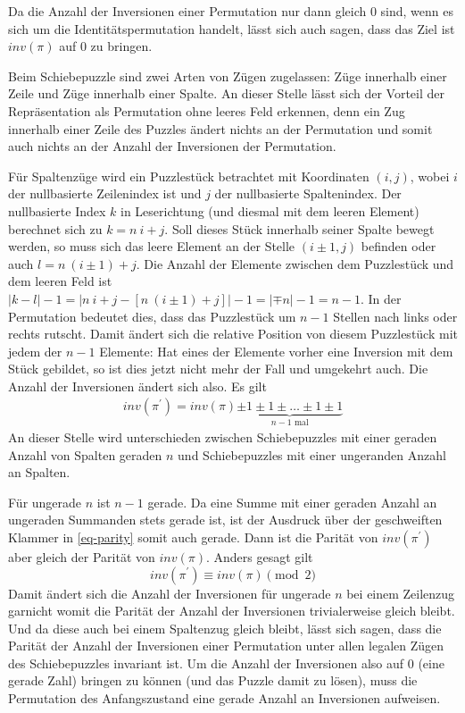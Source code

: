 \documentclass{whswinvcbook}
\begin{document}
Da die Anzahl der Inversionen einer Permutation nur dann gleich $0$ sind, wenn es sich um die Identitätspermutation handelt, lässt sich auch sagen, dass das Ziel ist $inv(\pi)$ auf $0$ zu bringen.

Beim Schiebepuzzle sind zwei Arten von Zügen zugelassen: Züge innerhalb einer Zeile und Züge innerhalb einer Spalte. An dieser Stelle lässt sich der Vorteil der Repräsentation als Permutation ohne leeres Feld erkennen, denn ein Zug innerhalb einer Zeile des Puzzles ändert nichts an der Permutation und somit auch nichts an der Anzahl der Inversionen der Permutation.

Für Spaltenzüge wird ein Puzzlestück betrachtet mit Koordinaten $(i,j)$, wobei $i$ der nullbasierte Zeilenindex ist und $j$ der nullbasierte Spaltenindex. Der nullbasierte Index $k$ in Leserichtung (und diesmal mit dem leeren Element) berechnet sich zu $k=n\:i+j$. Soll dieses Stück innerhalb seiner Spalte bewegt werden, so muss sich das leere Element an der Stelle $(i\pm1,j)$ befinden oder auch $l=n\:(i\pm1)+j$. Die Anzahl der Elemente zwischen dem Puzzlestück und dem leeren Feld ist $|k-l|-1=|n\:i+j-[n\:(i\pm1)+j]|-1=|\mp n|-1=n-1$. In der Permutation bedeutet dies, dass das Puzzlestück um $n-1$ Stellen nach links oder rechts rutscht. Damit ändert sich die relative Position von diesem Puzzlestück mit jedem der $n-1$ Elemente: Hat eines der Elemente vorher eine Inversion mit dem Stück gebildet, so ist dies jetzt nicht mehr der Fall und umgekehrt auch. Die Anzahl der Inversionen ändert sich also. Es gilt
\begin{align}\label{eq-parity}
    inv(\pi^\prime)=inv(\pi)\underbrace{\pm1\pm1\pm\dots\pm1\pm1}_{n-1\text{ mal}}
\end{align}
An dieser Stelle wird unterschieden zwischen Schiebepuzzles mit einer geraden Anzahl von Spalten geraden $n$ und Schiebepuzzles mit einer ungeranden Anzahl an Spalten.

Für ungerade $n$ ist $n-1$ gerade. Da eine Summe mit einer geraden Anzahl an ungeraden Summanden stets gerade ist, ist der Ausdruck über der geschweiften Klammer in \ref{eq-parity} somit auch gerade. Dann ist die Parität von $inv(\pi^\prime)$ aber gleich der Parität von $inv(\pi)$. Anders gesagt gilt$$inv(\pi^\prime)\equiv inv(\pi)\pmod2$$
Damit ändert sich die Anzahl der Inversionen für ungerade $n$ bei einem Zeilenzug garnicht womit die Parität der Anzahl der Inversionen trivialerweise gleich bleibt. Und da diese auch bei einem Spaltenzug gleich bleibt, lässt sich sagen, dass die Parität der Anzahl der Inversionen einer Permutation unter allen legalen Zügen des Schiebepuzzles invariant ist. Um die Anzahl der Inversionen also auf $0$ (eine gerade Zahl) bringen zu können (und das Puzzle damit zu lösen), muss die Permutation des Anfangszustand eine gerade Anzahl an Inversionen aufweisen.
\end{document}
